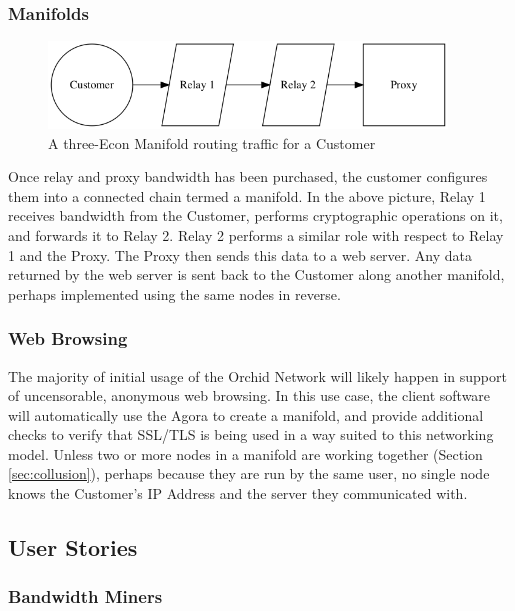 \documentclass{article}
\newcommand{\orchid}{Orchid}
\newcommand{\Orchid}{\orchid}
\begin{document}
\subsubsection{Manifolds}

\begin{figure}[htbp]
  \centering
  \includegraphics[width = 300pt]{sttc}
  \caption{A three-Econ Manifold routing traffic for a Customer}
\end{figure}

Once relay and proxy bandwidth has been purchased, the customer configures them into a connected chain termed a manifold. In the above picture, Relay 1 receives bandwidth from the Customer, performs cryptographic operations on it, and forwards it to Relay 2. Relay 2 performs a similar role with respect to Relay 1 and the Proxy. The Proxy then sends this data to a web server. Any data returned by the web server is sent back to the Customer along another manifold, perhaps implemented using the same nodes in reverse.

\subsubsection{Web Browsing}

The majority of initial usage of the \Orchid{} Network will likely happen in support of uncensorable, anonymous web browsing. In this use case, the client software will automatically use the Agora to create a manifold, and provide additional checks to verify that SSL/TLS is being used in a way suited to this networking model. Unless two or more nodes in a manifold are working together (Section \ref{sec:collusion}), perhaps because they are run by the same user, no single node knows the Customer's IP Address and the server they communicated with.

\subsection{User Stories}

\subsubsection{Bandwidth Miners}
\end{document}
